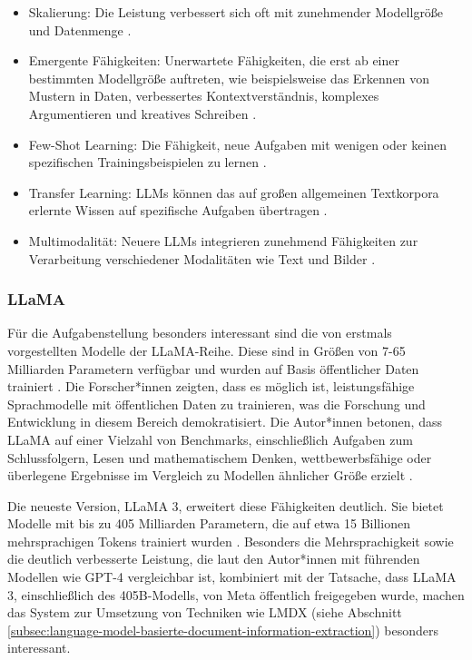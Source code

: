 \begin{itemize}
	\item Skalierung: Die Leistung verbessert sich oft mit zunehmender Modellgröße und Datenmenge \parencite{TouvronHugo2023LOaE}.
	\item Emergente Fähigkeiten: Unerwartete Fähigkeiten, die erst ab einer bestimmten Modellgröße auftreten, wie beispielsweise das Erkennen von Mustern in Daten, verbessertes Kontextverständnis, komplexes Argumentieren und kreatives Schreiben \parencite{BrownTomB2020LMaF}.
	\item Few-Shot Learning: Die Fähigkeit, neue Aufgaben mit wenigen oder keinen spezifischen Trainingsbeispielen zu lernen \parencite{BrownTomB2020LMaF}.
	\item Transfer Learning: \glspl{LLM} können das auf großen allgemeinen Textkorpora erlernte Wissen auf spezifische Aufgaben übertragen \parencite{DevlinJacob2019BPoD}.
	\item Multimodalität: Neuere \glspl{LLM} integrieren zunehmend Fähigkeiten zur Verarbeitung verschiedener Modalitäten wie Text und Bilder \parencite{LiJunnan2023BBLP}.
\end{itemize}

\subsubsection{LLaMA}
\label{subsubsec:LLaMA}

Für die Aufgabenstellung besonders interessant sind die von \textcite{TouvronHugo2023LOaE} erstmals vorgestellten Modelle der LLaMA-Reihe. Diese sind in Größen von 7-65 Milliarden Parametern verfügbar und wurden auf Basis öffentlicher Daten trainiert \parencite{TouvronHugo2023LOaE}. Die Forscher*innen zeigten, dass es möglich ist, leistungsfähige Sprachmodelle mit öffentlichen Daten zu trainieren, was die Forschung und Entwicklung in diesem Bereich demokratisiert. Die Autor*innen betonen, dass LLaMA auf einer Vielzahl von Benchmarks, einschließlich Aufgaben zum Schlussfolgern, Lesen und mathematischem Denken, wettbewerbsfähige oder überlegene Ergebnisse im Vergleich zu Modellen ähnlicher Größe erzielt \parencite{TouvronHugo2023LOaE}.

Die neueste Version, LLaMA 3, erweitert diese Fähigkeiten deutlich. Sie bietet Modelle mit bis zu 405 Milliarden Parametern, die auf etwa 15 Billionen mehrsprachigen Tokens trainiert wurden \parencite{HartshornAnthony2024TL3H}. Besonders die Mehrsprachigkeit sowie die deutlich verbesserte Leistung, die laut den Autor*innen mit führenden Modellen wie GPT-4 vergleichbar ist, kombiniert mit der Tatsache, dass LLaMA 3, einschließlich des 405B-Modells, von Meta öffentlich freigegeben wurde, machen das System zur Umsetzung von Techniken wie \gls{LMDX} (siehe Abschnitt \ref{subsec:language-model-basierte-document-information-extraction}) besonders interessant.

